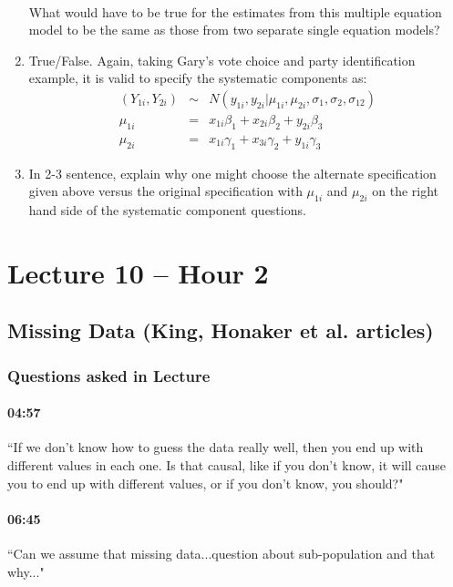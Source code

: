 \documentclass[11pt]{article}
\begin{document}
\begin{enumerate}
\begin{eqnarray*}
\end{eqnarray*}
What would have to be true for the estimates from this multiple equation model to be the same as those from two separate single equation models? %
\item True/False. Again, taking Gary's vote choice and party identification example, it is valid to specify the systematic components as:
\begin{eqnarray*}
(Y_{1i},Y_{2i}) &\sim& N(y_{1i},y_{2i}|\mu_{1i},\mu_{2i},\sigma_{1},\sigma_{2},\sigma_{12})\\
\mu_{1i} &=& x_{1i}\beta_1 + x_{2i}\beta_2 + y_{2i}\beta_3 \\
\mu_{2i} &=& x_{1i}\gamma_1 + x_{3i}\gamma_2 + y_{1i}\gamma_3
\end{eqnarray*}
\item In 2-3 sentence, explain why one might choose the alternate specification given above versus the original specification with $\mu_{1i}$ and $\mu_{2i}$ on the right hand side of the systematic component questions.
\end{enumerate}

\section{Lecture 10 -- Hour 2}

\subsection{Missing Data (King, Honaker et al. articles)}

\subsubsection{Questions asked in Lecture}

\paragraph{04:57} ``If we don't know how to guess the data really well, then you end up with different values in each one. Is that causal, like if you don't know, it will cause you to end up with different values, or if you don't know, you should?"

\paragraph{06:45} ``Can we assume that missing data...question about sub-population and that why..."
\end{document}
